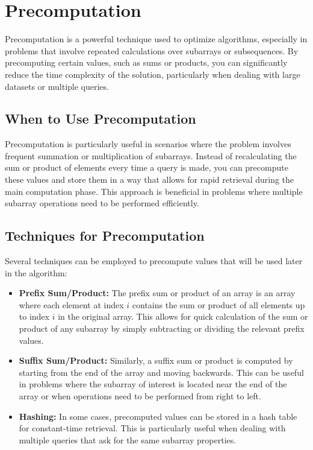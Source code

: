 \section{Precomputation}
\label{sec:Precomputation}

Precomputation is a powerful technique used to optimize algorithms, especially in problems that involve repeated calculations over subarrays or subsequences. By precomputing certain values, such as sums or products, you can significantly reduce the time complexity of the solution, particularly when dealing with large datasets or multiple queries.

\subsection*{When to Use Precomputation}

Precomputation is particularly useful in scenarios where the problem involves frequent summation or multiplication of subarrays. Instead of recalculating the sum or product of elements every time a query is made, you can precompute these values and store them in a way that allows for rapid retrieval during the main computation phase. This approach is beneficial in problems where multiple subarray operations need to be performed efficiently.

\subsection*{Techniques for Precomputation}

Several techniques can be employed to precompute values that will be used later in the algorithm:

\begin{itemize}
    \item \textbf{Prefix Sum/Product:} The prefix sum or product of an array is an array where each element at index \(i\) contains the sum or product of all elements up to index \(i\) in the original array. This allows for quick calculation of the sum or product of any subarray by simply subtracting or dividing the relevant prefix values.
    \item \textbf{Suffix Sum/Product:} Similarly, a suffix sum or product is computed by starting from the end of the array and moving backwards. This can be useful in problems where the subarray of interest is located near the end of the array or when operations need to be performed from right to left.
    \item \textbf{Hashing:} In some cases, precomputed values can be stored in a hash table for constant-time retrieval. This is particularly useful when dealing with multiple queries that ask for the same subarray properties.
\end{itemize}

